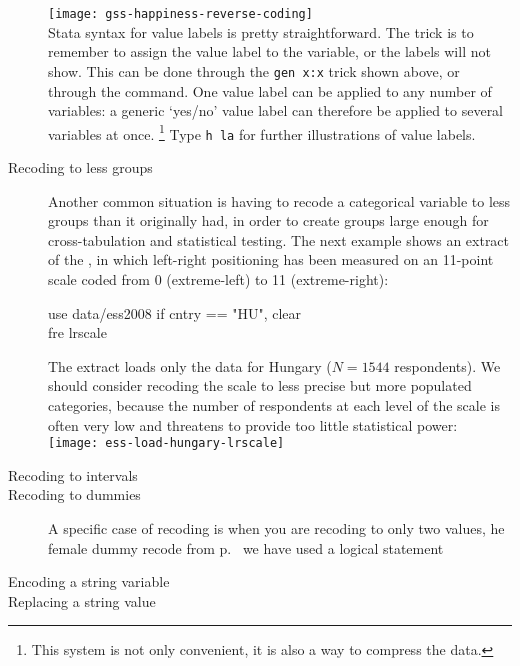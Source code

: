 \begin{description}
	\texttt{[image: gss-happiness-reverse-coding]}\\[1em]

%
Stata syntax for value labels is pretty straightforward. The trick is to remember to assign the value label to the variable, or the labels will not show. This can be done through the \texttt{gen x:x} trick shown above, or through the  command. One value label can be applied to any number of variables: a generic `yes/no' value label can therefore be applied to several variables at once.%
	\footnote{This system is not only convenient, it is also a way to compress the data.}
Type \texttt{h la} for further illustrations of value labels.

	\item[Recoding to less groups]%
Another common situation is having to recode a categorical variable to less groups than it originally had, in order to create groups large enough for cross-tabulation and statistical testing. The next example shows an extract of the \ess, in which left-right positioning has been measured on an 11-point scale coded from 0 (extreme-left) to 11 (extreme-right):

\begin{docspec}
	use data/ess2008 if cntry == "HU", clear\\
	fre lrscale
\end{docspec}

The extract loads only the data for Hungary ($N = 1544$ respondents). We should consider recoding the scale to less precise but more populated categories, because the number of respondents at each level of the scale is often very low and threatens to provide too little statistical power:\\[1em]

	\texttt{[image: ess-load-hungary-lrscale]}\\[1em]

	\item[Recoding to intervals]%

	\item[Recoding to dummies]%
A specific case of recoding is when you are recoding to only two values, he female dummy recode from p.~\pageref{female-dummy} we have used a logical statement

	\item[Encoding a string variable]%
	
	\item[Replacing a string value]%
	
\end{description}